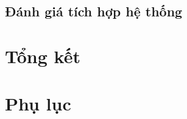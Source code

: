 \documentclass[11pt,a4paper,oneside]{book}
\begin{document}
\newpage
\section{Đánh giá tích hợp hệ thống}

\chapter{Tổng kết}

\newpage



\chapter*{Phụ lục} 
\end{document}
